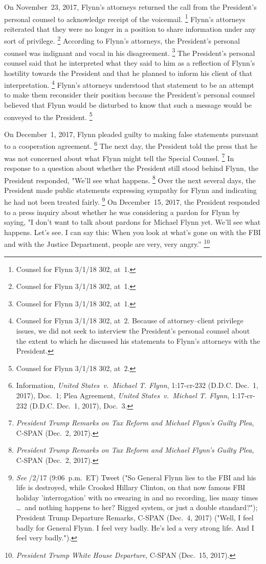 On November~23, 2017, Flynn's attorneys returned the call from the President's personal counsel to acknowledge receipt of the voicemail.%
\footnote{Counsel for Flynn 3/1/18 302, at~1.}
Flynn's attorneys reiterated that they were no longer in a position to share information under any sort of privilege.%
\footnote{Counsel for Flynn 3/1/18 302, at~1.}
According to Flynn's attorneys, the President's personal counsel was indignant and vocal in his disagreement.%
\footnote{Counsel for Flynn 3/1/18 302, at~1.}
The President's personal counsel said that he interpreted what they said to him as a reflection of Flynn's hostility towards the President and that he planned to inform his client of that interpretation.%
\footnote{Counsel for Flynn 3/1/18 302, at~2.
Because of attorney--client privilege issues, we did not seek to interview the President's personal counsel about the extent to which he discussed his statements to Flynn's attorneys with the President.}
Flynn's attorneys understood that statement to be an attempt to make them reconsider their position because the President's personal counsel believed that Flynn would be disturbed to know that such a message would be conveyed to the President.%
\footnote{Counsel for Flynn 3/1/18 302, at~2.}

On December~1, 2017, Flynn pleaded guilty to making false statements pursuant to a cooperation agreement.%
\footnote{Information, \textit{United States~v.\ Michael T. Flynn}, 1:17-cr-232 (D.D.C. Dec.~1, 2017), Doc.~1;
Plea Agreement, \textit{United States~v.\ Michael T. Flynn}, 1:17-cr-232 (D.D.C. Dec.~1, 2017), Doc.~3.}
The next day, the President told the press that he was not concerned about what Flynn might tell the Special Counsel.%
\footnote{\textit{President Trump Remarks on Tax Reform and Michael Flynn's Guilty Plea}, C-SPAN (Dec.~2, 2017).}
In response to a question about whether the President still stood behind Flynn, the President responded, "We'll see what happens.%
\footnote{\textit{President Trump Remarks on Tax Reform and Michael Flynn's Guilty Plea}, C-SPAN (Dec.~2, 2017).}
Over the next several days, the President made public statements expressing sympathy for Flynn and indicating he had not been treated fairly.%
\footnote{\textit{See} /2/17 (9:06~p.m.~ET) Tweet ("So General Flynn lies to the FBI and his life is destroyed, while Crooked Hillary Clinton, on that now famous FBI holiday 'interrogation' with no swearing in and no recording, lies many times \dots\ and nothing happens to her?
Rigged system, or just a double standard?");
President Trump Departure Remarks, C-SPAN (Dec.~4, 2017) ("Well, I feel badly for General Flynn.
I feel very badly.
He's led a very strong life.
And I feel very badly.").}
On December~15, 2017, the President responded to a press inquiry about whether he was considering a pardon for Flynn by saying, "I don't want to talk about pardons for Michael Flynn yet.
We'll see what happens.
Let's see.
I can say this: When you look at what's gone on with the FBI and with the Justice Department, people are very, very angry.''%
\footnote{\textit{President Trump White House Departure}, C-SPAN (Dec.~15, 2017).}

